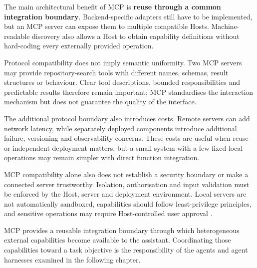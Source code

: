 The main architectural benefit of MCP is \textbf{reuse through a common integration boundary}. Backend-specific adapters still have to be implemented, but an MCP server can expose them to multiple compatible Hosts. Machine-readable discovery also allows a Host to obtain capability definitions without hard-coding every externally provided operation.

Protocol compatibility does not imply semantic uniformity. Two MCP servers may provide repository-search tools with different names, schemas, result structures or behaviour. Clear tool descriptions, bounded responsibilities and predictable results therefore remain important; MCP standardises the interaction mechanism but does not guarantee the quality of the interface.

The additional protocol boundary also introduces costs. Remote servers can add network latency, while separately deployed components introduce additional failure, versioning and observability concerns. These costs are useful when reuse or independent deployment matters, but a small system with a few fixed local operations may remain simpler with direct function integration.

MCP compatibility alone also does not establish a security boundary or make a connected server trustworthy. Isolation, authorisation and input validation must be enforced by the Host, server and deployment environment. Local servers are not automatically sandboxed, capabilities should follow least-privilege principles, and sensitive operations may require Host-controlled user approval \parencite{mcp2026security}.

MCP provides a reusable integration boundary through which heterogeneous external capabilities become available to the assistant. Coordinating those capabilities toward a task objective is the responsibility of the agents and agent harnesses examined in the following chapter.
